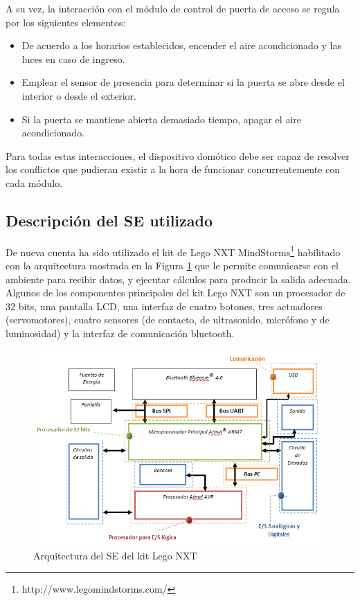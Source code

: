 \documentclass[journal]{IEEEtran}
\begin{document}
A su vez, la interacción con el módulo de control de puerta de acceso se regula por los siguientes elementos:
\begin{itemize}
	\item De acuerdo a los horarios establecidos, encender el aire acondicionado y las luces en caso de ingreso.
	\item Emplear el sensor de presencia para determinar si la puerta se abre desde el interior o desde el exterior.
	\item  Si la puerta se mantiene abierta demasiado tiempo, apagar el aire acondicionado.
\end{itemize} 

Para todas estas interacciones, el dispositivo domótico debe ser capaz de resolver los conflictos que pudieran existir a la hora de funcionar concurrentemente con cada módulo.

\subsection{Descripción del SE utilizado}
\label{sub:metodologia-descripcion-SE}

De nueva cuenta ha sido utilizado el kit de Lego NXT MindStorms\footnote{http://www.legomindstorms.com/} habilitado con la arquitectura mostrada en la Figura \ref{fig:arquitectura-se-lego} que le permite comunicarse con el ambiente para recibir datos, y ejecutar cálculos para producir la salida adecuada. Algunos de los componentes principales del kit Lego NXT son un procesador de 32 bits, una pantalla LCD, una interfaz de cuatro botones, tres actuadores (servomotores), cuatro sensores (de contacto, de ultrasonido, micrófono y de luminosidad) y la interfaz de comunicación bluetooth.

\begin{figure}[!t]
\centering
\includegraphics[width=\columnwidth]{diagramas/arquitectura-lego}
\caption{Arquitectura del SE del kit Lego NXT}
\label{fig:arquitectura-se-lego}
\end{figure}
\end{document}
